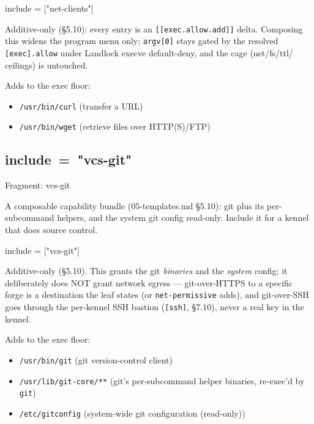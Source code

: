 \begin{kennelcode}
include = ["net-clients"]
\end{kennelcode}

Additive-only (§5.10): every entry is an
\texttt{{[}{[}exec.allow.add{]}{]}} delta. Composing this widens the
program menu only; \texttt{argv{[}0{]}} stays gated by the resolved
\texttt{{[}exec{]}.allow} under Landlock execve default-deny, and the
cage (net/fs/ttl/ ceilings) is untouched.

Adds to the exec floor:

\begin{itemize}
\tightlist
\item
  \texttt{/usr/bin/curl} (transfer a URL)
\item
  \texttt{/usr/bin/wget} (retrieve files over HTTP(S)/FTP)
\end{itemize}

\hypertarget{include-vcs-git}{%
\subsection{\texorpdfstring{include\ =\ "vcs-git"}{include = "vcs-git"}}\label{include-vcs-git}}

Fragment: vcs-git

A composable capability bundle (05-templates.md §5.10): git plus its
per-subcommand helpers, and the system git config read-only. Include it
for a kennel that does source control.

\begin{kennelcode}
include = ["vcs-git"]
\end{kennelcode}

Additive-only (§5.10). This grants the git \emph{binaries} and the
\emph{system} config; it deliberately does NOT grant network egress ---
git-over-HTTPS to a specific forge is a destination the leaf states (or
\texttt{net-permissive} adds), and git-over-SSH goes through the
per-kennel SSH bastion (\texttt{{[}ssh{]}}, §7.10), never a real key in
the kennel.

Adds to the exec floor:

\begin{itemize}
\tightlist
\item
  \texttt{/usr/bin/git} (git version-control client)
\item
  \texttt{/usr/lib/git-core/**} (git's per-subcommand helper binaries,
  re-exec'd by \texttt{git})
\item
  \texttt{/etc/gitconfig} (system-wide git configuration (read-only))
\end{itemize}


